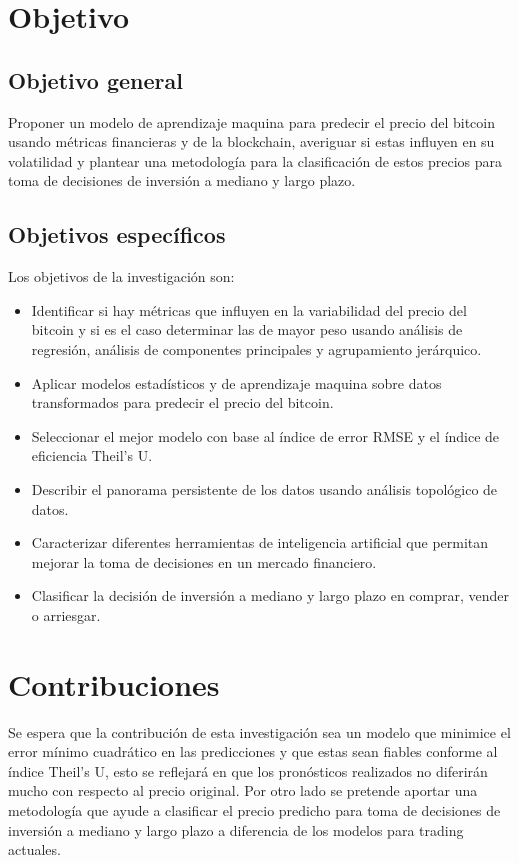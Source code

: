 \section{Objetivo}
\subsection{Objetivo general}
Proponer un modelo de aprendizaje maquina para predecir el precio del bitcoin usando métricas financieras y de la blockchain, averiguar si estas influyen en su volatilidad y %
plantear una metodología para la clasificación de estos precios para toma de decisiones de inversión a mediano y largo plazo.

\subsection{Objetivos específicos}
Los objetivos de la investigación son:
\begin{itemize}
	\item Identificar si hay métricas que influyen en la variabilidad del precio del bitcoin y si es el caso determinar las de mayor peso usando análisis de regresión, análisis de componentes principales y agrupamiento jerárquico.
	\item Aplicar modelos estadísticos y de aprendizaje maquina sobre datos transformados para predecir el precio del bitcoin.
	\item Seleccionar el mejor modelo con base al índice de error RMSE y el índice de eficiencia Theil's U.
	\item Describir el panorama persistente de los datos usando análisis topológico de datos.
	\item Caracterizar diferentes herramientas de inteligencia artificial que permitan mejorar la toma de decisiones en un mercado financiero.
	\item Clasificar la decisión de inversión a mediano y largo plazo en comprar, vender o arriesgar.
\end{itemize}

\section{Contribuciones}
Se espera que la contribución de esta investigación sea un modelo que minimice el error mínimo cuadrático en las predicciones y que estas sean fiables conforme al índice Theil's U, esto se reflejará en que los pronósticos realizados no diferirán mucho con respecto al precio original.
Por otro lado se pretende aportar una metodología que ayude a clasificar el precio predicho para toma de decisiones de inversión
a mediano y largo plazo a diferencia de los modelos para trading actuales.
\vspace{-0.5cm}
